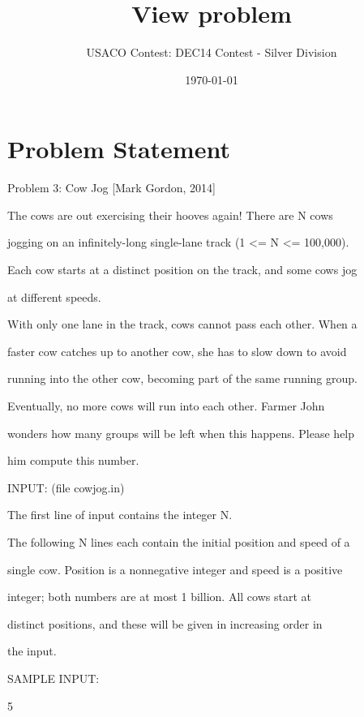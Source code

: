 \documentclass[12pt]{article}
\title{View problem}
\author{USACO Contest: DEC14 Contest - Silver Division}
\date{\today}
\begin{document}
\maketitle

\section*{Problem Statement}

Problem 3: Cow Jog [Mark Gordon, 2014]



The cows are out exercising their hooves again!  There are N cows

jogging on an infinitely-long single-lane track (1 <= N <= 100,000).

Each cow starts at a distinct position on the track, and some cows jog

at different speeds.



With only one lane in the track, cows cannot pass each other.  When a

faster cow catches up to another cow, she has to slow down to avoid

running into the other cow, becoming part of the same running group.



Eventually, no more cows will run into each other.  Farmer John

wonders how many groups will be left when this happens.  Please help

him compute this number.



INPUT: (file cowjog.in)



The first line of input contains the integer N.



The following N lines each contain the initial position and speed of a

single cow.  Position is a nonnegative integer and speed is a positive

integer; both numbers are at most 1 billion.  All cows start at 

distinct positions, and these will be given in increasing order in

the input.



SAMPLE INPUT:



5
\end{document}
